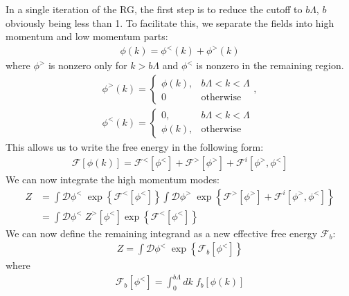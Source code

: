 \documentclass{article}
\begin{document}
In a single iteration of the RG, the first step is to reduce the cutoff to \(b\Lambda\), \(b\) obviously being less than 1. To facilitate this, we separate the fields into high momentum and low momentum parts:
\begin{equation}\begin{aligned}
\phi(k) = \phi^<(k) + \phi^>(k)
\end{aligned}\end{equation}
where \(\phi^>\) is nonzero only for \(k>b\Lambda\) and \(\phi^<\) is nonzero in the remaining region.
\begin{equation}\begin{aligned}
\phi^>(k) = \begin{cases} \phi(k), &b\Lambda < k <\Lambda\\ 0 &\text{otherwise} \end{cases},\\
\phi^<(k) = \begin{cases} 0, &b\Lambda < k <\Lambda\\ \phi(k), &\text{otherwise} \end{cases}
\end{aligned}\end{equation}
This allows us to write the free energy in the following form:
\begin{equation}\begin{aligned}
\mathcal{F}[\phi(k)] = \mathcal{F}^<[\phi^<] + \mathcal{F}^>[\phi^>] + \mathcal{F}^i[\phi^>,\phi^<]
\end{aligned}\end{equation}
We can now integrate the high momentum modes:
\begin{equation}\begin{aligned}
	Z &= \int \mathcal{D}\phi^<\; \exp\left\{\mathcal{F}^<[\phi^<]\right\}\int \mathcal{D}\phi^>\;\exp\left\{\mathcal{F}^>[\phi^>] + \mathcal{F}^i[\phi^>,\phi^<]\right\}\\
	  &=\int \mathcal{D}\phi^<\; Z^>[\phi^<]\exp\left\{\mathcal{F}^<[\phi^<]\right\}
\end{aligned}\end{equation}
We can now define the remaining integrand as a new effective free energy \(\mathcal{F}_b\):
\begin{equation}\begin{aligned}
	Z  =\int \mathcal{D}\phi^<\; \exp\left\{\mathcal{F}_b[\phi^<]\right\}
\end{aligned}\end{equation}
where
\begin{equation}\begin{aligned}
\mathcal{F}_b[\phi^<] = \int_0^{b\Lambda} dk\;{f_b}[\phi(k)]
\end{aligned}\end{equation}
\end{document}
